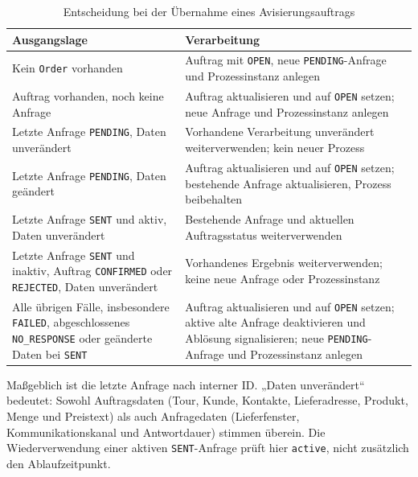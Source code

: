 \documentclass[
  12pt,
  a4paper,
  oneside
]{article}
\begin{document}
\begin{table}[htbp]
  \centering
  \caption{Entscheidung bei der Übernahme eines Avisierungsauftrags}
  \label{tab:avisierungsauftrag-entscheidung}
  \small
  \setlength{\tabcolsep}{5pt}
  \begin{tabularx}{\textwidth}{@{}>{\raggedright\arraybackslash}p{}>{\raggedright\arraybackslash}X@{}}
    \toprule
    Ausgangslage & Verarbeitung \\
    \midrule
    Kein \texttt{Order} vorhanden
      & Auftrag mit \texttt{OPEN}, neue \texttt{PENDING}-Anfrage und Prozessinstanz anlegen \\
    Auftrag vorhanden, noch keine Anfrage
      & Auftrag aktualisieren und auf \texttt{OPEN} setzen; neue Anfrage und Prozessinstanz anlegen \\
    Letzte Anfrage \texttt{PENDING}, Daten unverändert
      & Vorhandene Verarbeitung unverändert weiterverwenden; kein neuer Prozess \\
    Letzte Anfrage \texttt{PENDING}, Daten geändert
      & Auftrag aktualisieren und auf \texttt{OPEN} setzen; bestehende Anfrage aktualisieren, Prozess beibehalten \\
    Letzte Anfrage \texttt{SENT} und aktiv, Daten unverändert
      & Bestehende Anfrage und aktuellen Auftragsstatus weiterverwenden \\
    Letzte Anfrage \texttt{SENT} und inaktiv, Auftrag \texttt{CONFIRMED} oder \texttt{REJECTED}, Daten unverändert
      & Vorhandenes Ergebnis weiterverwenden; keine neue Anfrage oder Prozessinstanz \\
    Alle übrigen Fälle, insbesondere \texttt{FAILED}, abgeschlossenes \texttt{NO\_RESPONSE} oder geänderte Daten bei \texttt{SENT}
      & Auftrag aktualisieren und auf \texttt{OPEN} setzen; aktive alte Anfrage deaktivieren und Ablösung signalisieren; neue \texttt{PENDING}-Anfrage und Prozessinstanz anlegen \\
    \bottomrule
  \end{tabularx}
  \par\smallskip
  \begin{minipage}{\textwidth}
    \footnotesize
    Maßgeblich ist die letzte Anfrage nach interner ID. „Daten unverändert“
    bedeutet: Sowohl Auftragsdaten (Tour, Kunde, Kontakte, Lieferadresse,
    Produkt, Menge und Preistext) als auch Anfragedaten (Lieferfenster,
    Kommunikationskanal und Antwortdauer) stimmen überein.
    Die Wiederverwendung einer aktiven \texttt{SENT}-Anfrage prüft hier
    \texttt{active}, nicht zusätzlich den Ablaufzeitpunkt.
  \end{minipage}
\end{table}
\end{document}
